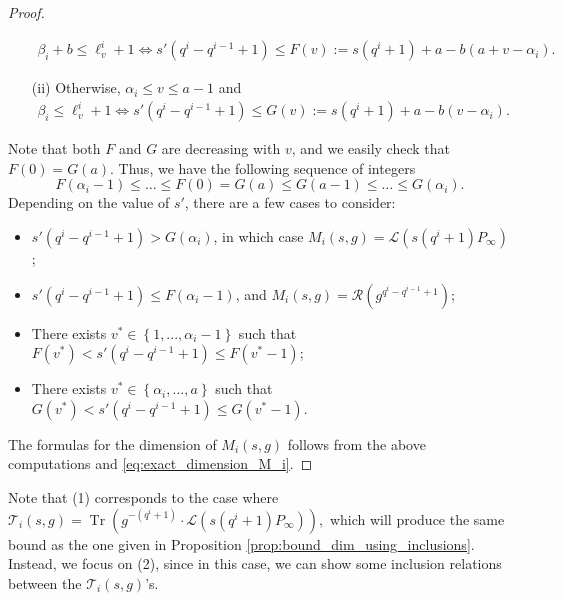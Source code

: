 \documentclass[lettersize,journal]{IEEEtran}
\theoremstyle{plain}
\theoremstyle{definition}
\theoremstyle{remark}
\DeclareMathOperator{\trace}{Tr}
\newcommand{\calL}{\mathcal{L}}
\newcommand{\calR}{\mathcal{R}}
\newcommand{\calT}{\mathcal{T}}
\newcommand{\Tr}[1]{\trace\!\left(#1\right)}
\newcommand{\set}[1]{\left\{#1\right\}}
\begin{document}
\begin{proof}
\begin{itemize}
\begin{align*}
				\beta_i+b \leq \ell_v^i +1 \iff s'(q^i-q^{i-1}+1) \leq F(v) := s(q^i+1)+a-b(a+v-\alpha_i).
			\end{align*}
			\item[(ii)] Otherwise, $\alpha_i \leq v \leq a-1$ and
			\begin{align*}
				\beta_i \leq \ell_v^i +1 \iff s'(q^i-q^{i-1}+1) \leq G(v) := s(q^i+1)+a-b(v-\alpha_i).
			\end{align*}
		\end{itemize}
		Note that both $F$ and $G$ are decreasing with $v$, and we easily check that $F(0) = G(a)$. Thus, we have the following sequence of integers
		$$F(\alpha_i-1) \leq \dots \leq F(0) = G(a) \leq G(a-1) \leq \dots \leq G(\alpha_i).$$
		Depending on the value of $s'$, there are a few cases  to consider:
		\begin{itemize}
			\item $s'(q^i-q^{i-1}+1) >G(\alpha_i)$, in which case $M_i(s,g) = \calL(s(q^i+1)P_\infty)$;
			\item $s'(q^i-q^{i-1}+1) \leq F(\alpha_i-1)$, and $M_i(s,g) = \calR(g^{q^i-q^{i-1}+1})$;
			\item There exists $v^* \in \set{1,...,\alpha_i-1}$ such that $F(v^*) < s'(q^i-q^{i-1}+1) \leq F(v^*-1)$;
			\item There exists $v^* \in \set{\alpha_i,...,a}$ such that $G(v^*) < s'(q^i-q^{i-1}+1) \leq G(v^*-1)$.
		\end{itemize}
		The formulas for the dimension of $M_i(s,g)$ follows from the above computations and \eqref{eq:exact_dimension_M_i}.
	\end{proof}
	
	Note that (1) corresponds to the case where $\calT_i(s,g) = \Tr{g^{-(q^i+1)}\cdot \calL(s(q^i+1)P_\infty)}, $ which will produce the same bound as the one given in Proposition \ref{prop:bound_dim_using_inclusions}.
	Instead, we focus on (2), since in this case, we can show some inclusion relations between the $\calT_i(s,g)$'s.
	
\end{document}
